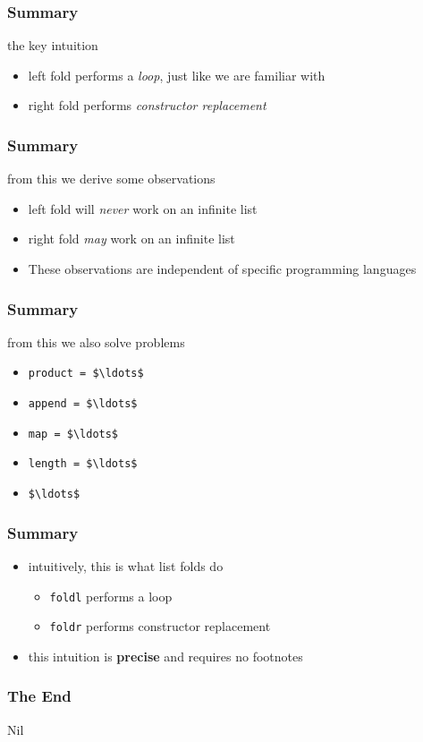\begin{frame}
\frametitle{Summary}
\begin{block}{the key intuition}
\begin{itemize}
\item left fold performs a \emph{loop}, just like we are familiar with
\item right fold performs \emph{constructor replacement}
\end{itemize}
\end{block}
\end{frame}

\begin{frame}
\frametitle{Summary}
\begin{block}{from this we derive some observations}
\begin{itemize}
\item left fold will \emph{never} work on an infinite list
\item right fold \emph{may} work on an infinite list
\item These observations are independent of specific programming languages
\end{itemize}
\end{block}
\end{frame}

\begin{frame}[fragile]
\frametitle{Summary}
\begin{block}{from this we also solve problems}
\begin{itemize}
\item \lstinline[mathescape]{product = $\ldots$}
\item \lstinline[mathescape]{append = $\ldots$}
\item \lstinline[mathescape]{map = $\ldots$}
\item \lstinline[mathescape]{length = $\ldots$}
\item \lstinline[mathescape]{$\ldots$}
\end{itemize}
\end{block}
\end{frame}

\begin{frame}
\frametitle{Summary}
\begin{block}{}
\begin{itemize}
\item intuitively, this is what list folds do
  \begin{itemize}
  \item \lstinline[basicstyle=\ttfamily]$foldl$ performs a loop
  \item \lstinline[basicstyle=\ttfamily]$foldr$ performs constructor replacement
  \end{itemize}
\item this intuition is \textbf{precise} and requires no footnotes
\end{itemize}
\end{block}
\end{frame}

\begin{frame}
\frametitle{The End}
\begin{center}
Nil
\end{center}
\end{frame}
